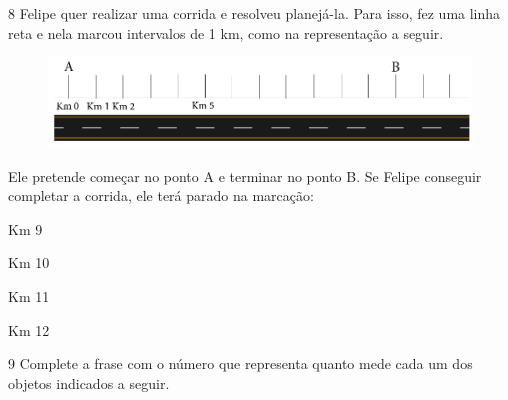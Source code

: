 


\num{8} Felipe quer realizar uma corrida e resolveu planejá-la. Para isso,
fez uma linha reta e nela marcou intervalos de 1 km, como na representação a seguir.

\begin{figure}[htpb!]
\includegraphics[width=\textwidth]{../ilustracoes/MAT5/SAEB_5ANO_MAT_figura6.png}
\end{figure}

Ele pretende começar no ponto A e terminar no ponto B. Se Felipe
conseguir completar a corrida, ele terá parado na marcação:

\begin{multicols}{2}
\begin{escolha}
\item
  Km 9
\item
  Km 10
\item
  Km 11
\item
  Km 12
\end{escolha}
\end{multicols}


\num{9} Complete a frase com o número que representa quanto mede cada um
dos objetos indicados a seguir.

